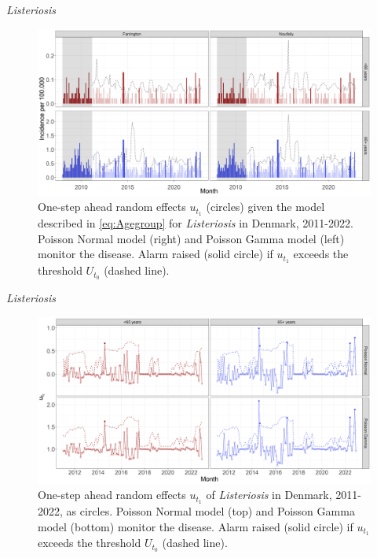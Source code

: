 \documentclass[aspectratio=169]{beamer}
\begin{document}
\begin{frame}{\emph{Listeriosis}}
\tiny

\begin{figure}[H]
\includegraphics[width=0.7\linewidth]{../figures/Compare_stateOfTheArt_LIST} \caption{One-step ahead random effects $u_{t_1}$ (circles) given the model described in \eqref{eq:Agegroup} for \textit{Listeriosis} in Denmark, 2011-2022. Poisson Normal model (right) and Poisson Gamma model (left) monitor the disease. Alarm raised (solid circle) if $u_{t_1}$ exceeds the threshold $U_{t_0}$ (dashed line).}\label{fig:CompareStateOfTheArtLIST}
\end{figure}

\normalsize
\end{frame}

\begin{frame}{\emph{Listeriosis}}
\protect\hypertarget{listeriosis-1}{}
\tiny

\begin{figure}[H]
\includegraphics[width=0.7\linewidth]{../figures/Compare_novel_LIST} \caption{One-step ahead random effects $u_{t_1}$ of \textit{Listeriosis} in Denmark, 2011-2022, as circles. Poisson Normal model (top) and Poisson Gamma model (bottom) monitor the disease. Alarm raised (solid circle) if $u_{t_1}$ exceeds the threshold $U_{t_0}$ (dashed line).}\label{fig:CompareNovelLIST}
\end{figure}

\normalsize
\end{frame}
\end{document}
